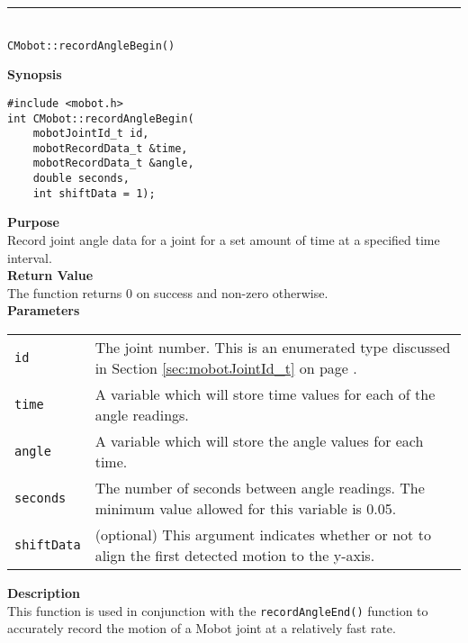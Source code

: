 \noindent
\vspace{5pt}
\rule{4.5in}{0.015in}\\
\noindent
{\LARGE \texttt{CMobot::recordAngleBegin()}}\\
{}

\noindent
{\bf Synopsis}
\vspace{-8pt}
\begin{verbatim}
#include <mobot.h>
int CMobot::recordAngleBegin(
    mobotJointId_t id, 
    mobotRecordData_t &time, 
    mobotRecordData_t &angle, 
    double seconds, 
    int shiftData = 1);
\end{verbatim}

\noindent
{\bf Purpose}\\
Record joint angle data for a joint for a set amount of time at a specified time interval.\\

\noindent
{\bf Return Value}\\
The function returns 0 on success and non-zero otherwise.\\

\noindent
{\bf Parameters}\\
\vspace{-0.1in}
\begin{description}
\item               
\begin{tabular}{p{15 mm}p{145 mm}}
\texttt{id} & The joint number. This is an enumerated type 
discussed in Section \ref{sec:mobotJointId_t} on page
\pageref{sec:mobotJointId_t}.\\
\texttt{time} & A variable which will store time values for each of the angle readings. \\
\texttt{angle} & A variable which will store the angle values for each time. \\
\texttt{seconds} & The number of seconds between angle readings. The minimum value allowed for
this variable is 0.05. \\
\texttt{shiftData} & (optional) This argument indicates whether or not to align the first
detected motion to the y-axis. 
\end{tabular}
\end{description}

\noindent
{\bf Description}\\
This function is used in conjunction with the \texttt{recordAngleEnd()}
function to accurately record the motion of a Mobot joint at a relatively fast
rate. 

